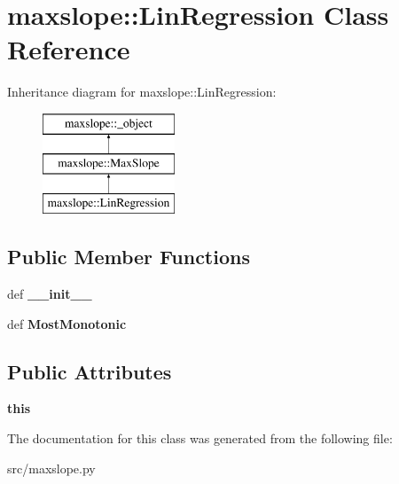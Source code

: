 \hypertarget{classmaxslope_1_1LinRegression}{
\section{maxslope::LinRegression Class Reference}
\label{d4/dbe/classmaxslope_1_1LinRegression}
}
Inheritance diagram for maxslope::LinRegression:\begin{figure}[H]
\begin{center}
\leavevmode
\includegraphics[height=3cm]{d4/dbe/classmaxslope_1_1LinRegression}
\end{center}
\end{figure}
\subsection*{Public Member Functions}
\begin{DoxyCompactItemize}
\item 
\hypertarget{classmaxslope_1_1LinRegression_ab45de3d79a109d5e052e219a102dbeec}{
def {\bfseries \_\-\_\-init\_\-\_\-}}
\label{d4/dbe/classmaxslope_1_1LinRegression_ab45de3d79a109d5e052e219a102dbeec}

\item 
\hypertarget{classmaxslope_1_1LinRegression_a963c3ebdaab1a12e99a6efc812de9226}{
def {\bfseries MostMonotonic}}
\label{d4/dbe/classmaxslope_1_1LinRegression_a963c3ebdaab1a12e99a6efc812de9226}

\end{DoxyCompactItemize}
\subsection*{Public Attributes}
\begin{DoxyCompactItemize}
\item 
\hypertarget{classmaxslope_1_1LinRegression_a359905ee6312345940c5ad51583acbc8}{
{\bfseries this}}
\label{d4/dbe/classmaxslope_1_1LinRegression_a359905ee6312345940c5ad51583acbc8}

\end{DoxyCompactItemize}


The documentation for this class was generated from the following file:\begin{DoxyCompactItemize}
\item 
src/maxslope.py\end{DoxyCompactItemize}
